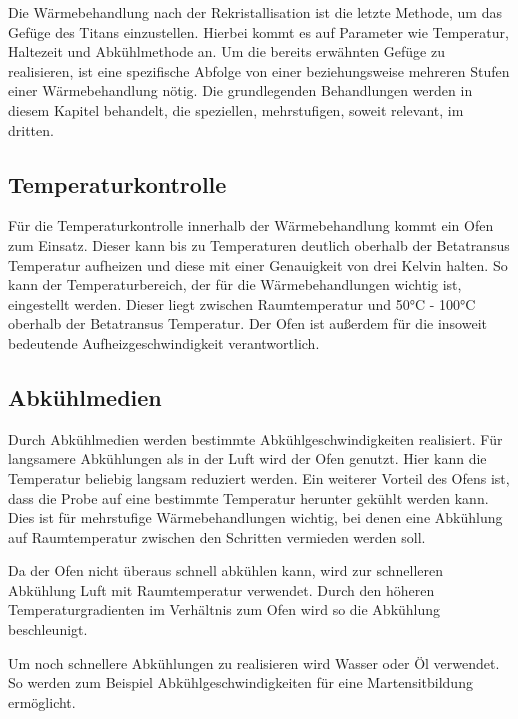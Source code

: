 \documentclass[a4paper, 11pt]{tubsreprt}
\begin{document}
Die Wärmebehandlung nach der Rekristallisation ist die letzte Methode, um das Gefüge des Titans einzustellen. Hierbei kommt es auf Parameter wie Temperatur, Haltezeit und Abkühlmethode an. Um die bereits erwähnten Gefüge zu realisieren, ist eine spezifische Abfolge von einer beziehungsweise mehreren Stufen einer Wärmebehandlung nötig. Die grundlegenden Behandlungen werden in diesem Kapitel behandelt, die speziellen, mehrstufigen, soweit relevant, im dritten.
\subsection{Temperaturkontrolle}
Für die Temperaturkontrolle innerhalb der Wärmebehandlung kommt ein Ofen zum Einsatz. Dieser kann bis zu Temperaturen deutlich oberhalb der Betatransus Temperatur aufheizen und diese mit einer Genauigkeit von drei Kelvin halten. So kann der Temperaturbereich, der für die Wärmebehandlungen wichtig ist, eingestellt werden. Dieser liegt zwischen Raumtemperatur und 50°C - 100°C oberhalb der Betatransus Temperatur. Der Ofen ist außerdem für die insoweit bedeutende Aufheizgeschwindigkeit verantwortlich.

\subsection{Abkühlmedien}

Durch Abkühlmedien werden bestimmte Abkühlgeschwindigkeiten realisiert. Für langsamere Abkühlungen als in der Luft wird der Ofen genutzt. Hier kann die Temperatur beliebig langsam reduziert werden. Ein weiterer Vorteil des Ofens ist, dass die Probe auf eine bestimmte Temperatur herunter gekühlt werden kann. Dies ist für mehrstufige Wärmebehandlungen wichtig, bei denen eine Abkühlung auf Raumtemperatur zwischen den Schritten vermieden werden soll. 

Da der Ofen nicht überaus schnell abkühlen kann, wird zur schnelleren Abkühlung Luft mit Raumtemperatur verwendet. Durch den höheren Temperaturgradienten im Verhältnis zum Ofen wird so die Abkühlung beschleunigt.  

Um noch schnellere Abkühlungen zu realisieren wird Wasser oder Öl verwendet. So werden zum Beispiel Abkühlgeschwindigkeiten für eine Martensitbildung ermöglicht.
\end{document}
